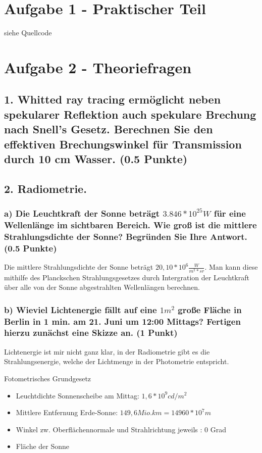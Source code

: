 \documentclass[12pt]{scrreprt}
\begin{document}


\chapter*{Aufgabe 1 - Praktischer Teil}

siehe Quellcode

\chapter*{Aufgabe 2 - Theoriefragen}

\section*{1. Whitted ray tracing ermöglicht neben spekularer Reflektion auch spekulare Brechung nach Snell's Gesetz. Berechnen Sie den effektiven Brechungswinkel für Transmission durch 10 cm Wasser. (0.5 Punkte)}


\section*{2. Radiometrie.}

\subsection*{a) Die Leuchtkraft der Sonne beträgt $3.846 * 10^{25} W$ für eine Wellenlänge im sichtbaren Bereich. Wie groß ist die mittlere Strahlungsdichte der Sonne? Begründen Sie Ihre Antwort. (0.5 Punkte)}

Die mittlere Strahlungsdichte der Sonne beträgt $20,10 * 10^6 \frac{W}{m^2 * sr}$. Man kann diese mithilfe des Planckschen Strahlungsgesetzes durch Intergration der Leuchtkraft über alle von der Sonne abgestrahlten Wellenlängen berechnen.

\subsection*{b) Wieviel Lichtenergie fällt auf eine $1 m^2$ große Fläche in Berlin in 1 min. am 21. Juni um 12:00 Mittags? Fertigen hierzu zunächst eine Skizze an. (1 Punkt)}

Lichtenergie ist mir nicht ganz klar, in der Radiometrie gibt es die Strahlungsenergie, welche der Lichtmenge in der Photometrie entspricht.

Fotometrisches Grundgesetz

\begin{itemize}
  \item Leuchtdichte Sonnenscheibe am Mittag: $1,6 *10^9 cd/m^2$
  \item Mittlere Entfernung Erde-Sonne: $149,6 Mio. km = 14960 * 10^7 m$
  \item Winkel zw. Oberflächennormale und Strahlrichtung jeweils : 0 Grad
  \item Fläche der Sonne
\end{itemize}
\end{document}
